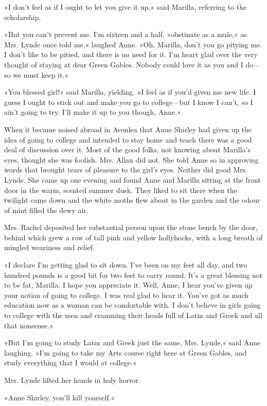»I don't feel as if I ought to let you give it up,« said Marilla, referring to the scholarship.

»But you can't prevent me. I'm sixteen and a half, »obstinate as a mule,« as Mrs. Lynde once told me,« laughed Anne. »Oh, Marilla, don't you go pitying me. I don't like to be pitied, and there is no need for it. I'm heart glad over the very thought of staying at dear Green Gables. Nobody could love it as you and I do—so we must keep it.«

»You blessed girl!« said Marilla, yielding. »I feel as if you'd given me new life. I guess I ought to stick out and make you go to college—but I know I can't, so I ain't going to try. I'll make it up to you though, Anne.«

When it became noised abroad in Avonlea that Anne Shirley had given up the idea of going to college and intended to stay home and teach there was a good deal of discussion over it. Most of the good folks, not knowing about Marilla's eyes, thought she was foolish. Mrs. Allan did not. She told Anne so in approving words that brought tears of pleasure to the girl's eyes. Neither did good Mrs. Lynde. She came up one evening and found Anne and Marilla sitting at the front door in the warm, scented summer dusk. They liked to sit there when the twilight came down and the white moths flew about in the garden and the odour of mint filled the dewy air.

Mrs. Rachel deposited her substantial person upon the stone bench by the door, behind which grew a row of tall pink and yellow hollyhocks, with a long breath of mingled weariness and relief.

»I declare I'm getting glad to sit down. I've been on my feet all day, and two hundred pounds is a good bit for two feet to carry round. It's a great blessing not to be fat, Marilla. I hope you appreciate it. Well, Anne, I hear you've given up your notion of going to college. I was real glad to hear it. You've got as much education now as a woman can be comfortable with. I don't believe in girls going to college with the men and cramming their heads full of Latin and Greek and all that nonsense.«

»But I'm going to study Latin and Greek just the same, Mrs. Lynde,« said Anne laughing. »I'm going to take my Arts course right here at Green Gables, and study everything that I would at college.«

Mrs. Lynde lifted her hands in holy horror.

»Anne Shirley, you'll kill yourself.«

